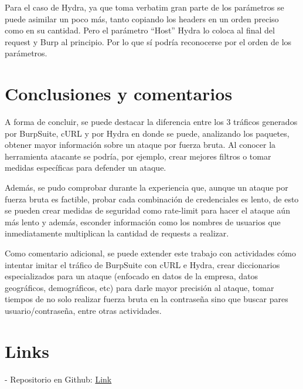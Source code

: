 \documentclass[letter,12pt]{article}
\begin{document}
Para el caso de Hydra, ya que toma verbatim gran parte de los parámetros se
puede asimilar un poco más, tanto copiando los headers en un orden preciso como
en su cantidad. Pero el parámetro ``Host'' Hydra lo coloca al final
del request y Burp al principio. Por lo que sí podría reconocerse por el orden
de los parámetros.

\section*{Conclusiones y comentarios}
A forma de concluir, se puede destacar la diferencia entre los 3 tráficos
generados por BurpSuite, cURL y por Hydra en donde se puede, analizando los
paquetes, obtener mayor información sobre un ataque por fuerza bruta. Al conocer
la herramienta atacante se podría, por ejemplo, crear mejores filtros o tomar
medidas específicas para defender un ataque.

Además, se pudo comprobar durante la experiencia que, aunque un ataque por
fuerza bruta es factible, probar cada combinación de credenciales es lento, de
esto se pueden crear medidas de seguridad como rate-limit para hacer el ataque
aún más lento y además, esconder información como los nombres de usuarios que
inmediatamente multiplican la cantidad de requests a realizar.

Como comentario adicional, se puede extender este trabajo con actividades cómo
intentar imitar el tráfico de BurpSuite con cURL e Hydra, crear diccionarios
especializados para un ataque (enfocado en datos de la empresa, datos
geográficos, demográficos, etc) para darle mayor precisión al ataque, tomar
tiempos de no solo realizar fuerza bruta en la contraseña sino que buscar pares
usuario/contraseña, entre otras actividades.

\section*{Links}
- Repositorio en Github: \href{https://github.com/wzrdd/cripto}{Link}
\end{document}
